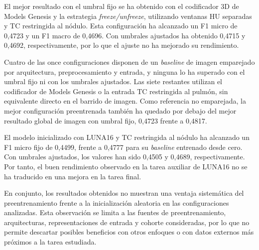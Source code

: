 El mejor resultado con el umbral fijo se ha obtenido con el codificador 3D de Models Genesis y la estrategia \textit{freeze/unfreeze}, utilizando ventanas HU separadas y TC restringida al nódulo. Esta configuración ha alcanzado un F1 micro de 0,4723 y un F1 macro de 0,4696. Con umbrales ajustados ha obtenido 0,4715 y 0,4692, respectivamente, por lo que el ajuste no ha mejorado su rendimiento.

Cuatro de las once configuraciones disponen de un \textit{baseline} de imagen emparejado por arquitectura, preprocesamiento y entrada, y ninguna lo ha superado con el umbral fijo ni con los umbrales ajustados. Las siete restantes utilizan el codificador de Models Genesis o la entrada TC restringida al pulmón, sin equivalente directo en el barrido de imagen. Como referencia no emparejada, la mejor configuración preentrenada también ha quedado por debajo del mejor resultado global de imagen con umbral fijo, 0,4723 frente a 0,4817.

El modelo inicializado con LUNA16 y TC restringida al nódulo ha alcanzado un F1 micro fijo de 0,4499, frente a 0,4777 para su \textit{baseline} entrenado desde cero. Con umbrales ajustados, los valores han sido 0,4505 y 0,4689, respectivamente. Por tanto, el buen rendimiento observado en la tarea auxiliar de LUNA16 no se ha traducido en una mejora en la tarea final.

En conjunto, los resultados obtenidos no muestran una ventaja sistemática del preentrenamiento frente a la inicialización aleatoria en las configuraciones analizadas. Esta observación se limita a las fuentes de preentrenamiento, arquitecturas, representaciones de entrada y cohorte consideradas, por lo que no permite descartar posibles beneficios con otros enfoques o con datos externos más próximos a la tarea estudiada.








